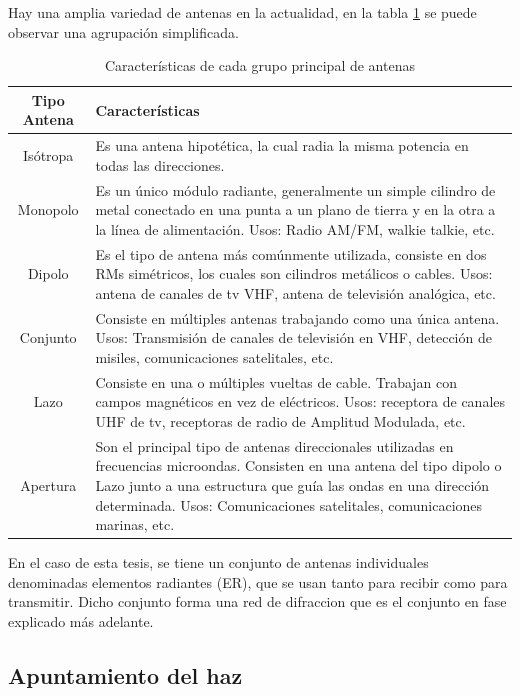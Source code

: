 Hay una amplia variedad de antenas en la actualidad, en la tabla \ref{tab:type_antennas} se puede observar una agrupación 
simplificada.

\begin{table}[H]
  \footnotesize
  \centering
  \begin{tabular}{|c|p{9cm}|}
	\hline
	\textbf{Tipo Antena} & \textbf{Características} \\\hline
	Isótropa & Es una antena hipotética, la cual radia la misma potencia en todas las direcciones.\\\hline
	Monopolo & Es un único módulo radiante, generalmente un simple cilindro de metal conectado en una punta a un plano de
	tierra y en la otra a la línea de alimentación. Usos: Radio AM/FM, walkie talkie, etc. \\\hline
	Dipolo & Es el tipo de antena más comúnmente utilizada, consiste en dos RMs simétricos, los cuales son cilindros
	metálicos o cables. Usos: antena de canales de tv VHF, antena de televisión analógica, etc. \\\hline
	Conjunto & Consiste en múltiples antenas trabajando como una única antena. Usos: Transmisión de canales de televisión en VHF,
	detección de misiles, comunicaciones satelitales, etc.\\\hline
	Lazo & Consiste en una o múltiples vueltas de cable. Trabajan con campos magnéticos en vez de eléctricos. Usos: receptora
	de canales UHF de tv, receptoras de radio de Amplitud Modulada, etc.\\\hline
	Apertura & Son el principal tipo de antenas direccionales utilizadas en frecuencias microondas. Consisten en una antena
	del tipo dipolo o Lazo junto a una estructura que guía las ondas en una dirección determinada. Usos: Comunicaciones
	satelitales, comunicaciones marinas, etc.\\\hline
  \end{tabular}
  \caption{Características de cada grupo principal de antenas}
  \label{tab:type_antennas}
\end{table}


En el caso de esta tesis, se tiene un conjunto de antenas individuales denominadas elementos radiantes (ER), que se usan tanto
para recibir como para transmitir. Dicho conjunto forma una red de difraccion que es el conjunto en fase explicado más adelante.


\subsection{Apuntamiento del haz} 

